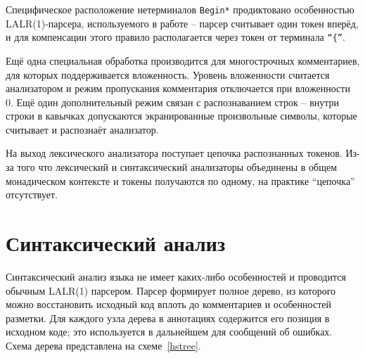 \documentclass[a4paper,12pt]{article}
\begin{document}
Специфическое расположение нетерминалов \texttt{Begin*} продиктовано
особенностью LALR(1)-парсера, используемого в работе -- парсер считывает один
токен вперёд, и для компенсации этого правило располагается через токен от
терминала \texttt{``\{''}.

Ещё одна специальная обработка производится для многострочных комментариев, для
которых поддерживается вложенность. Уровень вложенности считается анализатором и
режим пропускания комментария отключается при вложенности 0. Ещё один
дополнительный режим связан с распознаванием строк -- внутри строки в кавычках
допускаются экранированные произвольные символы, которые считывает и распознаёт
анализатор.

На выход лексического анализатора поступает цепочка распознанных токенов. Из-за
того что лексический и синтаксический анализаторы объединены в общем
монадическом контексте и токены получаются по одному, на практике ``цепочка''
отсутствует.

\section{Синтаксический анализ}

Синтаксический анализ языка не имеет каких-либо особенностей и проводится
обычным LALR(1) парсером. Парсер формирует полное дерево, из которого можно
восстановить исходный код вплоть до комментариев и особенностей разметки. Для
каждого узла дерева в аннотациях содержится его позиция в исходном коде; это
используется в дальнейшем для сообщений об ошибках. Схема дерева представлена на
схеме~\ref{hstree}.
\end{document}
